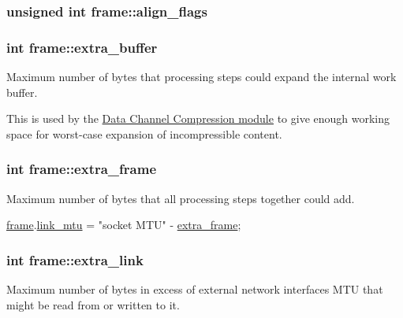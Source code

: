 \subsubsection[{align\+\_\+flags}]{\setlength{\rightskip}{0pt plus 5cm}unsigned int frame\+::align\+\_\+flags}\label{structframe_ae4656e48742f781f15b6887fc77ee035}
\hypertarget{structframe_a751b9e1d0cf1c29cd4befef61d811f70}{}
\subsubsection[{extra\+\_\+buffer}]{\setlength{\rightskip}{0pt plus 5cm}int frame\+::extra\+\_\+buffer}\label{structframe_a751b9e1d0cf1c29cd4befef61d811f70}
Maximum number of bytes that processing steps could expand the internal work buffer.

This is used by the \hyperlink{}{Data Channel Compression module} to give enough working space for worst-\/case expansion of incompressible content. \hypertarget{structframe_ac86e1095a0ba3e1cc909aaba9ecf6360}{}
\subsubsection[{extra\+\_\+frame}]{\setlength{\rightskip}{0pt plus 5cm}int frame\+::extra\+\_\+frame}\label{structframe_ac86e1095a0ba3e1cc909aaba9ecf6360}
Maximum number of bytes that all processing steps together could add. 
\begin{DoxyCode}
\hyperlink{structframe}{frame}.\hyperlink{structframe_a1cb819c0d909fde0754358ab1a3efa27}{link\_mtu} = \textcolor{stringliteral}{"socket MTU"} - \hyperlink{structframe_ac86e1095a0ba3e1cc909aaba9ecf6360}{extra\_frame};
\end{DoxyCode}
 \hypertarget{structframe_aff384304bf6617e9326581562dd47db4}{}
\subsubsection[{extra\+\_\+link}]{\setlength{\rightskip}{0pt plus 5cm}int frame\+::extra\+\_\+link}\label{structframe_aff384304bf6617e9326581562dd47db4}
Maximum number of bytes in excess of external network interface\textquotesingle{}s M\+T\+U that might be read from or written to it. \hypertarget{structframe_a692c06fcb8a7e839f14c44616809ce10}{}
